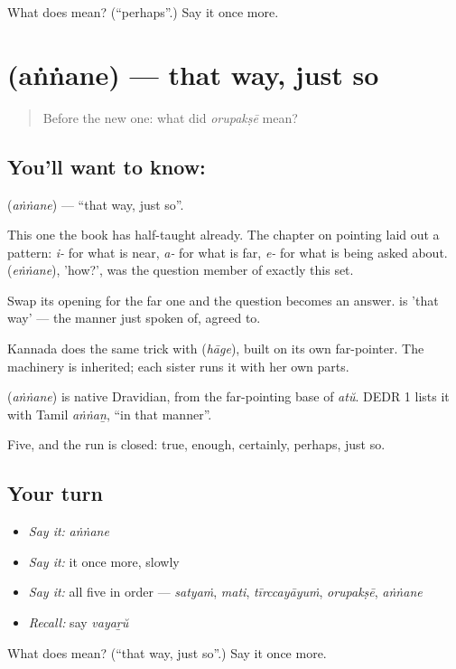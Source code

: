 \begin{tcolorbox}[breakable,colback=teal!4,colframe=teal!35!black,title={Before you move on}]
What does  mean? (\textquotedblleft{}perhaps\textquotedblright{}.) Say it once more.
\end{tcolorbox}
\section[\texorpdfstring{\ml{അങ്ങനെ} (aṅṅane)}{അങ്ങനെ (aṅṅane)}]{ (aṅṅane) — that way, just so}

\label{lesson:ML-C49-just-so}



\begin{quote}
Before the new one: what did \emph{orupakṣē} mean?
\end{quote}

\subsection*{You'll want to know: }
\textbf{} (\emph{aṅṅane}) — \textquotedblleft{}that way, just so\textquotedblright{}.

This one the book has half-taught already. The chapter on pointing laid out a pattern: \emph{i-} for what is near, \emph{a-} for what is far, \emph{e-} for what is being asked about.  (\emph{eṅṅane}), 'how?', was the question member of exactly this set.

Swap its opening for the far one and the question becomes an answer.  is 'that way' — the manner just spoken of, agreed to.

Kannada does the same trick with  (\emph{hāge}), built on its own far-pointer. The machinery is inherited; each sister runs it with her own parts.

\begin{cousinweb}
\textbf{} (\emph{aṅṅane}) is native Dravidian, from the far-pointing base of \emph{atŭ}. DEDR 1 lists it with Tamil \emph{aṅṅaṉ}, \textquotedblleft{}in that manner\textquotedblright{}.
\end{cousinweb}

\begin{grammarlens}[title={What you've built}]
Five, and the run is closed: true, enough, certainly, perhaps, just so.
\end{grammarlens}

\subsection*{Your turn}
\begin{itemize}
\raggedright
  \item \emph{Say it:} \emph{aṅṅane}
  \item \emph{Say it:} it once more, slowly
  \item \emph{Say it:} all five in order — \emph{satyaṁ}, \emph{mati}, \emph{tīrccayāyuṁ}, \emph{orupakṣē}, \emph{aṅṅane}
  \item \emph{Recall:} say \emph{vayaṟŭ}
\end{itemize}

\begin{tcolorbox}[breakable,colback=teal!4,colframe=teal!35!black,title={Before you move on}]
What does  mean? (\textquotedblleft{}that way, just so\textquotedblright{}.) Say it once more.
\end{tcolorbox}
